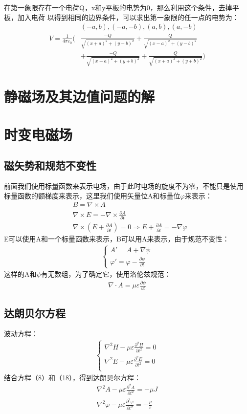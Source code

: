 \documentclass[UTF8]{article}
\begin{document}
在第一象限存在一个电荷Q，x和y平板的电势为0，那么利用这个条件，去掉平板，加入电荷
以得到相同的边界条件，可以求出第一象限的任一点的电势为：
\begin{align*}
     &(-a,b),(-a,-b),(a,b),(a,-b)\\
     V = \frac{1}{4\pi \varepsilon_0}(
    &\frac{-Q}{\sqrt{(x+a)^2+(y-b)^2}}
     +\frac{Q}{\sqrt{(x-a)^2+(y-b)^2}}\\
     &+\frac{-Q}{\sqrt{(x-a)^2+(y+b)^2}}+\frac{Q}{\sqrt{(x+a)^2+(y+b)^2}})
\end{align*}


\newpage
\section{静磁场及其边值问题的解}
\section{时变电磁场}
\subsection{磁矢势和规范不变性}
前面我们使用标量函数来表示电场，由于此时电场的旋度不为零，不能只是使用
标量函数的额梯度来表示，这里我们使用矢量位A和标量位$\varphi$来表示：
\begin{align}
    &B=\nabla \times A\\
    &\nabla \times E = -\nabla \times \frac{\partial A}{\partial t}\\
    & \nabla \times(E+\frac{\partial A}{\partial t})=0\Rightarrow E
    +\frac{\partial A}{\partial t}=-\nabla \varphi
\end{align}
E可以使用A和一个标量函数来表示，B可以用A来表示，由于规范不变性：
\begin{align}
    \begin{cases}
        A' = A + \nabla \psi \\
        \varphi' = \varphi - \frac{\partial \psi}{\partial t}
    \end{cases}
\end{align}
这样的A和$\psi$有无数组，为了确定它，使用洛伦兹规范：
\begin{align}
    \nabla \cdot A = \mu\varepsilon \frac{\partial \psi}{\partial t}
\end{align}
\subsection{达朗贝尔方程}
波动方程：
\begin{align}
    \begin{cases}
        \nabla^2H-\mu\varepsilon \frac{\partial^2 H}{\partial t^2}=0 \\
        \nabla^2E-\mu\varepsilon \frac{\partial^2 E}{\partial t^2}=0 \\
    \end{cases}
\end{align}
结合方程（8）和（18），得到达朗贝尔方程：
\begin{align}
    \nabla^2 A -\mu\varepsilon \frac{\partial^2 A}{\partial t^2}=-\mu J\\
    \nabla^2 \varphi -\mu\varepsilon \frac{\partial^2 \varphi}{\partial t^2}=-\frac{\rho}{\varepsilon}
\end{align}
\end{document}
